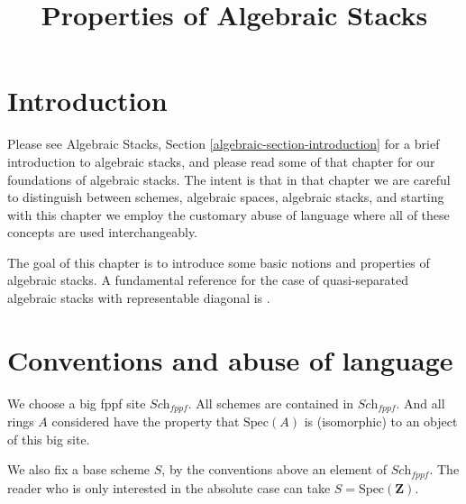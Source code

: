 

%


\title{Properties of Algebraic Stacks}


\maketitle

\label{section-phantom}

\tableofcontents

\section{Introduction}
\label{section-introduction}

\noindent
Please see
Algebraic Stacks, Section \ref{algebraic-section-introduction}
for a brief introduction to algebraic stacks, and please read
some of that chapter for our foundations of algebraic stacks.
The intent is that in that chapter we are careful to distinguish
between schemes, algebraic spaces, algebraic stacks, and starting
with this chapter we employ the customary abuse of language where
all of these concepts are used interchangeably.

\medskip\noindent
The goal of this chapter is to introduce some basic notions and
properties of algebraic stacks. A fundamental
reference for the case of quasi-separated algebraic stacks with representable
diagonal is \cite{LM-B}.



\section{Conventions and abuse of language}
\label{section-conventions}

\noindent
We choose a big fppf site $\textit{Sch}_{fppf}$.
All schemes are contained in $\textit{Sch}_{fppf}$.
And all rings $A$ considered have the property that
$\text{Spec}(A)$ is (isomorphic) to an object of this big site.

\medskip\noindent
We also fix a base scheme $S$, by the conventions above an element
of $\textit{Sch}_{fppf}$. The reader who is only interested
in the absolute case can take $S = \text{Spec}(\mathbf{Z})$.

